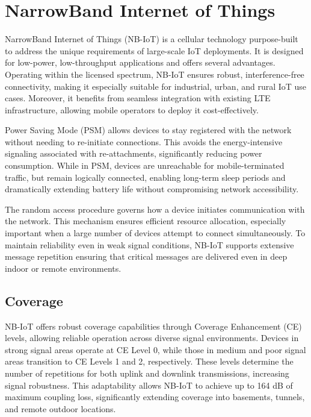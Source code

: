\section{NarrowBand Internet of Things}

NarrowBand Internet of Things (NB-IoT) is a cellular technology purpose-built to address the unique requirements of large-scale IoT deployments. 
It is designed for low-power, low-throughput applications and offers several advantages. 
Operating within the licensed spectrum, NB-IoT ensures robust, interference-free connectivity, making it especially suitable for industrial, urban, and rural IoT use cases. 
Moreover, it benefits from seamless integration with existing LTE infrastructure, allowing mobile operators to deploy it cost-effectively.

Power Saving Mode (PSM) allows devices to stay registered with the network without needing to re-initiate connections. 
This avoids the energy-intensive signaling associated with re-attachments, significantly reducing power consumption. 
While in PSM, devices are unreachable for mobile-terminated traffic, but remain logically connected, enabling long-term sleep periods and dramatically extending battery life without compromising network accessibility.

The random access procedure governs how a device initiates communication with the network. 
This mechanism ensures efficient resource allocation, especially important when a large number of devices attempt to connect simultaneously. 
To maintain reliability even in weak signal conditions, NB-IoT supports extensive message repetition ensuring that critical messages are delivered even in deep indoor or remote environments.

\subsection{Coverage}
NB-IoT offers robust coverage capabilities through Coverage Enhancement (CE) levels, allowing reliable operation across diverse signal environments. 
Devices in strong signal areas operate at CE Level 0, while those in medium and poor signal areas transition to CE Levels 1 and 2, respectively. 
These levels determine the number of repetitions for both uplink and downlink transmissions, increasing signal robustness. 
This adaptability allows NB-IoT to achieve up to 164 dB of maximum coupling loss, significantly extending coverage into basements, tunnels, and remote outdoor locations.

